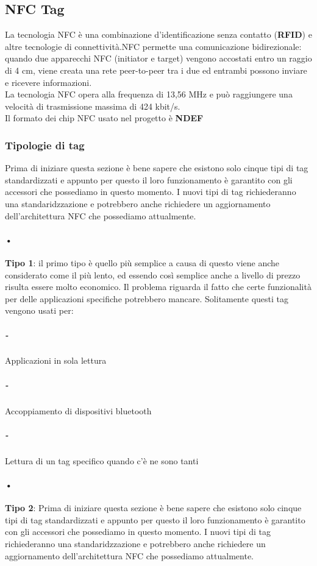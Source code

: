 \subsection{NFC Tag}
\hspace{\parindent}La tecnologia NFC  è una combinazione d'identificazione senza contatto (\textbf{RFID}) e altre tecnologie di connettività.NFC permette una comunicazione bidirezionale: quando due apparecchi NFC (initiator e target) vengono accostati entro un raggio di 4 cm, viene creata una rete peer-to-peer tra i due ed entrambi possono inviare e ricevere informazioni.
\\La tecnologia NFC opera alla frequenza di 13,56 MHz e può raggiungere una velocità di trasmissione massima di 424 kbit/s.
\\Il formato dei chip NFC usato nel progetto è \textbf{NDEF} 
\subsubsection{Tipologie di tag}
\hspace{\parindent}Prima di iniziare questa sezione è bene sapere che esistono solo cinque tipi di tag standardizzati e appunto per questo il loro funzionamento è garantito con gli accessori che possediamo in questo momento. I nuovi tipi di tag richiederanno una standaridzzazione e potrebbero anche richiedere un aggiornamento dell'architettura NFC che possediamo attualmente.

\paragraph{•}\textbf{Tipo 1}: il primo tipo è quello più semplice a causa di questo viene anche considerato come il più lento, ed essendo così semplice anche a livello di prezzo risulta essere molto economico. Il problema riguarda il fatto che certe funzionalità per delle applicazioni specifiche potrebbero mancare. Solitamente questi tag vengono usati per:
\subparagraph{-} Applicazioni in sola lettura
\subparagraph{-} Accoppiamento di dispositivi bluetooth
\subparagraph{-} Lettura di un tag specifico quando c'è ne sono tanti

\paragraph{•}\textbf{Tipo 2}:
Prima di iniziare questa sezione è bene sapere che esistono solo cinque tipi di tag standardizzati e appunto per questo il loro funzionamento è garantito con gli accessori che possediamo in questo momento. I nuovi tipi di tag richiederanno una standaridzzazione e potrebbero anche richiedere un aggiornamento dell'architettura NFC che possediamo attualmente.

